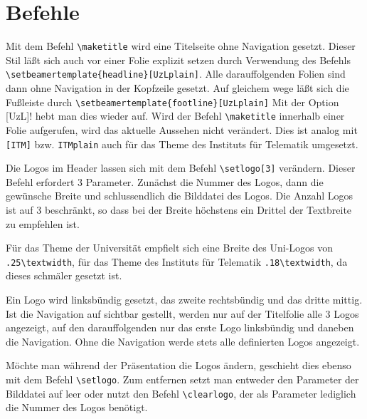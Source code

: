\documentclass[a4paper,DIV=calc, oneside]{scrartcl}
\newcommand{\cmd}[1]{\marginpar{\color{UzLcolor}\textrm{#1}}}
\begin{document}
\section{Befehle}
Mit dem Befehl \lstinline!\maketitle!\cmd{\textbackslash maketitle} wird eine Titelseite ohne Navigation gesetzt. Dieser Stil läßt sich auch vor einer Folie explizit setzen durch Verwendung des Befehls\\ \lstinline!\setbeamertemplate{headline}[UzLplain]!\cmd{[UzLplain]}. Alle darauffolgenden Folien sind dann ohne Navigation in der Kopfzeile gesetzt. Auf gleichem wege läßt sich die Fußleiste durch \lstinline!\setbeamertemplate{footline}[UzLplain]! Mit der Option \lstinline!![UzL]! hebt man dies wieder auf.
Wird der Befehl \lstinline!\maketitle! innerhalb einer Folie aufgerufen, wird das aktuelle Aussehen nicht verändert. Dies ist analog mit \lstinline![ITM]! bzw. \lstinline!ITMplain! auch für das Theme des Instituts für Telematik umgesetzt.

Die Logos im Header lassen sich mit dem Befehl \lstinline!\setlogo[3]!\cmd{\textbackslash setlogo} verändern. Dieser Befehl erfordert 3 Parameter. Zunächst die Nummer des Logos, dann die gewünsche Breite und schlussendlich die Bilddatei des Logos. Die Anzahl Logos ist auf 3 beschränkt, so dass bei der Breite höchstens ein Drittel der Textbreite zu empfehlen ist.

Für das Theme der Universität empfielt sich eine Breite des Uni-Logos von \lstinline!.25\textwidth!, für das Theme des Instituts für Telematik \lstinline!.18\textwidth!, da dieses schmäler gesetzt ist.

Ein Logo wird linksbündig gesetzt, das zweite rechtsbündig und das dritte mittig. Ist die Navigation auf sichtbar gestellt, werden nur auf der Titelfolie alle 3 Logos angezeigt, auf den darauffolgenden nur das erste Logo linksbündig und daneben die Navigation. Ohne die Navigation werde stets alle definierten Logos angezeigt.

Möchte man während der Präsentation die Logos ändern, geschieht dies ebenso mit dem Befehl \lstinline!\setlogo!. Zum entfernen setzt man entweder den Parameter der Bilddatei auf leer oder nutzt den Befehl \lstinline!\clearlogo!\cmd{\textbackslash clearlogo}, der als Parameter lediglich die Nummer des Logos benötigt.
\end{document}
